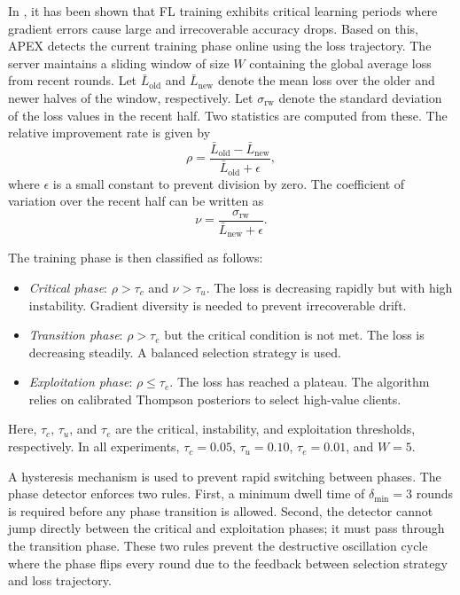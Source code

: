\documentclass[journal]{IEEEtran}
\begin{document}
In \cite{yan2023criticalfl}, it has been shown that FL training exhibits critical learning periods where gradient errors cause large and irrecoverable accuracy drops. Based on this, APEX detects the current training phase online using the loss trajectory. The server maintains a sliding window of size $W$ containing the global average loss from recent rounds. Let $\bar{L}_{\text{old}}$ and $\bar{L}_{\text{new}}$ denote the mean loss over the older and newer halves of the window, respectively. Let $\sigma_{\text{rw}}$ denote the standard deviation of the loss values in the recent half. Two statistics are computed from these. The relative improvement rate is given by
\begin{equation}
\rho = \frac{\bar{L}_{\text{old}} - \bar{L}_{\text{new}}}{\bar{L}_{\text{old}} + \epsilon},
\label{eq:rate}
\end{equation}
where $\epsilon$ is a small constant to prevent division by zero. The coefficient of variation over the recent half can be written as
\begin{equation}
\nu = \frac{\sigma_{\text{rw}}}{\bar{L}_{\text{new}} + \epsilon}.
\label{eq:cv}
\end{equation}

The training phase is then classified as follows:
\begin{itemize}
    \item \textit{Critical phase}: $\rho > \tau_c$ and $\nu > \tau_u$. The loss is decreasing rapidly but with high instability. Gradient diversity is needed to prevent irrecoverable drift.
    \item \textit{Transition phase}: $\rho > \tau_e$ but the critical condition is not met. The loss is decreasing steadily. A balanced selection strategy is used.
    \item \textit{Exploitation phase}: $\rho \leq \tau_e$. The loss has reached a plateau. The algorithm relies on calibrated Thompson posteriors to select high-value clients.
\end{itemize}
Here, $\tau_c$, $\tau_u$, and $\tau_e$ are the critical, instability, and exploitation thresholds, respectively. In all experiments, $\tau_c = 0.05$, $\tau_u = 0.10$, $\tau_e = 0.01$, and $W = 5$.

A hysteresis mechanism is used to prevent rapid switching between phases. The phase detector enforces two rules. First, a minimum dwell time of $\delta_{\min} = 3$ rounds is required before any phase transition is allowed. Second, the detector cannot jump directly between the critical and exploitation phases; it must pass through the transition phase. These two rules prevent the destructive oscillation cycle where the phase flips every round due to the feedback between selection strategy and loss trajectory.
\end{document}
